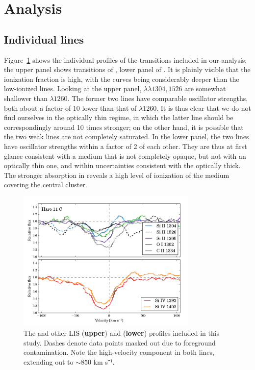 \documentclass[twocolumn]{aastex61}
\begin{document}
\section{Analysis}\label{analysis}

\subsection{Individual lines}\label{individual-lines}

Figure~\ref{fig:SingleLines} shows the individual profiles of the
transitions included in our analysis; the upper panel shows transitions
of , lower panel of . It is plainly visible that
the ionization fraction is high, with the  curves being
considerably deeper than the low-ionized lines. Looking at the upper
panel,  $\lambda \lambda 1304, 1526$ are somewhat shallower
than  $\lambda 1260$. The former two lines have comparable
oscillator strengths, both about a factor of 10 lower than that of
$\lambda 1260$. It is thus clear that we do not find ourselves in the
optically thin regime, in which the latter line should be
correspondingly around 10 times stronger; on the other hand, it is
possible that the two weak lines are not completely saturated. In the
lower panel, the two  lines have oscillator strengths within
a factor of 2 of each other. They are thus at first glance consistent
with a medium that is not completely opaque, but not with an optically
thin one, and within uncertainties consistent with the optically thick.
The stronger absorption in  reveals a high level of
ionization of the medium covering the central cluster.

\begin{figure}
\centering
\includegraphics[width=3.500in]{./HISLISProfiles.pdf}
\caption{The  and other LIS (\textbf{upper}) and 
(\textbf{lower}) profiles included in this study. Dashes denote data
points masked out due to foreground contamination. Note the
high-velocity component in both  lines, extending out to
$\sim 850$ km s⁻¹.}\label{fig:SingleLines}
\end{figure}
\end{document}
